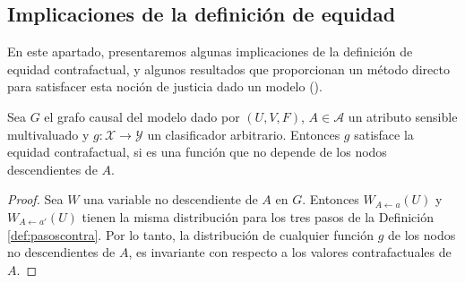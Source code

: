 \documentclass[oneside,openright,titlepage,numbers=noenddot,openany,headinclude,footinclude=true,
cleardoublepage=empty,abstractoff,BCOR=5mm,paper=a4,fontsize=12pt,main=spanish]{scrreprt}
\begin{document}
\subsection{Implicaciones de la definición de equidad}

En este apartado, presentaremos algunas implicaciones de la definición de equidad contrafactual, y algunos resultados que proporcionan un método directo para satisfacer esta noción de justicia dado un modelo (\cite{counterfactual2018}).\\

\begin{lemma} \label{lem:nodescent}
Sea $G$ el grafo causal del modelo dado por $(U,V,F)$, $A\in \mathcal{A}$ un atributo sensible multivaluado y $g\colon \mathcal{X} \to \mathcal{Y}$ un clasificador arbitrario. Entonces $g$ satisface la equidad contrafactual, si es una función que no depende de los nodos descendientes de $A$.
\end{lemma}

\begin{proof}
Sea $W$ una variable no descendiente de $A$ en $G$. Entonces $W_{A\leftarrow a}(U)$ y $W_{A\leftarrow a'}(U)$ tienen la misma distribución para los tres pasos de la Definición \ref{def:pasoscontra}. Por lo tanto, la distribución de cualquier función $g$ de los nodos no descendientes de $A$, es invariante con respecto a los valores contrafactuales de $A$.
\end{proof}
\end{document}
